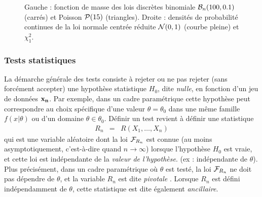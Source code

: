 \begin{figure}[h!]
\begin{minipage}[c]{.46\linewidth}
			\end{minipage}
	\caption{
      \label{chapitre1-fig1a}
      Gauche : fonction de masse des lois discr\`etes binomiale ${\cal{B}}_n(100,0.1)$ (carr\'es) et Poisson ${\cal{P}}(15)$ (triangles). Droite : densit\'es de probabilit\'e continues de la loi normale centr\'ee r\'eduite ${\cal{N}}(0,1)$ (courbe pleine) et $\chi^2_1$.}
\end{figure}


\subsubsection*{Tests statistiques}\label{test.statistique.classique}

La d\'emarche g\'en\'erale des tests consiste \`a rejeter ou ne pas rejeter (sans forc\'ement accepter) une hypoth\`ese statistique $H_0$, dite {\it nulle}, en fonction d'un jeu de donn\'ees ${\bf x_n}$. Par exemple, dans un cadre param\'etrique cette hypoth\`ese peut correspondre au  choix sp\'ecifique d'une valeur $\theta=\theta_0$ dans une m\^eme famille $f(x|\theta)$ ou d'un domaine $\theta\in\theta_0$. D\'efinir un test revient \`a d\'efinir une statistique
\begin{eqnarray*}
R_n & = & R(X_1,\ldots,X_n)
\end{eqnarray*}
qui est une variable al\'eatoire dont la loi ${\cal{F}}_{R_n}$ est connue (au moins asymptotiquement, c'est-\`a-dire quand $n\to\infty$) lorsque l'hypoth\`ese $H_0$ est vraie, et cette loi est ind\'ependante de la {\it valeur de l'hypoth\`ese}.  (ex : ind\'ependante de $\theta$). Plus pr\'ecis\'ement, dans un cadre param\'etrique o\`u $\theta$ est test\'e, la loi ${\cal{F}}_{R_n}$ ne doit pas d\'ependre de $\theta$, et  la variable $R_n$ est dite {\it pivotale} . Lorsque $R_n$ est d\'efini ind\'ependamment de $\theta$, cette statistique est dite \'egalement {\it ancillaire}.  \\

